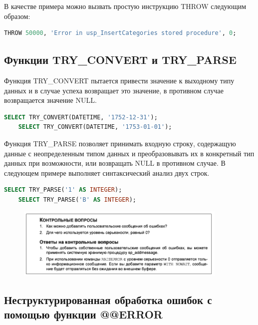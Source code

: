 В качестве примера можно вызвать простую инструкцию THROW следующим образом: 


\begin{lstlisting}[label=lst:funcReturn, language=sql]
	THROW 50000, 'Error in usp_InsertCategories stored procedure', 0; 
\end{lstlisting}

\subsection*{Функции TRY\_CONVERT и TRY\_PARSE}

Функция TRY\_CONVERT пытается
привести значение к выходному типу данных и в случае успеха возвращает это значение, в противном случае возвращается значение NULL. 

\begin{lstlisting}[label=lst:funcReturn, language=sql]
	SELECT TRY_CONVERT(DATETIME, '1752-12-31');
	SELECT TRY_CONVERT(DATETIME, '1753-01-01');
\end{lstlisting}

Функция TRY\_PARSE позволяет принимать входную строку, содержащую данные
с неопределенным типом данных и преобразовывать их в конкретный тип данных
при возможности, или возвращать NULL в противном случае. В следующем примере
выполняет синтаксический анализ двух строк. 

\begin{lstlisting}[label=lst:funcReturn, language=sql]
	SELECT TRY_PARSE('1' AS INTEGER);
	SELECT TRY_PARSE('B' AS INTEGER); 
\end{lstlisting}

\begin{figure}[h!]
	\begin{center}
		\includegraphics[width=0.9\textwidth]{img/control33.png}
	\end{center}
	\captionsetup{justification=centering}
\end{figure}

\subsection{Неструктурированная обработка ошибок с помощью функции @@ERROR}


